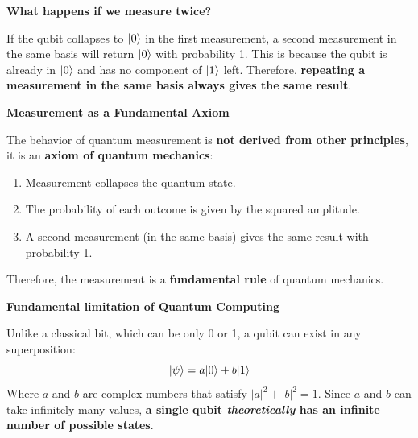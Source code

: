 \newpage

\begin{flushleft}
    \textcolor{Green3}{ \textbf{What happens if we measure twice?}}
\end{flushleft}
If the qubit collapses to $| 0 \rangle$ in the first measurement, a second measurement in the same basis will return $| 0 \rangle$ with probability 1. This is because the qubit is already in $| 0 \rangle$ and has no component of $| 1 \rangle$ left. Therefore, \textbf{repeating a measurement in the same basis always gives the same result}.

\highspace
\begin{flushleft}
    \textcolor{Red2}{ \textbf{Measurement as a Fundamental Axiom}}
\end{flushleft}
The behavior of quantum measurement is \textbf{not derived from other principles}, it is an \textbf{axiom of quantum mechanics}:
\begin{enumerate}
    \item Measurement collapses the quantum state.
    \item The probability of each outcome is given by the squared amplitude.
    \item A second measurement (in the same basis) gives the same result with probability 1.
\end{enumerate}
Therefore, the measurement is a \textbf{fundamental rule} of quantum mechanics.

\highspace
\begin{flushleft}
    \textcolor{Red2}{ \textbf{Fundamental limitation of Quantum Computing}}
\end{flushleft}
Unlike a classical bit, which can be only 0 or 1, a qubit can exist in any superposition:
\begin{equation*}
    | \psi \rangle = a | 0 \rangle + b | 1 \rangle
\end{equation*}
Where $a$ and $b$ are complex numbers that satisfy $\left|a\right|^{2} + \left|b\right|^{2} = 1$. Since $a$ and $b$ can take infinitely many values, \textbf{a single qubit \emph{theoretically} has an infinite number of possible states}.

